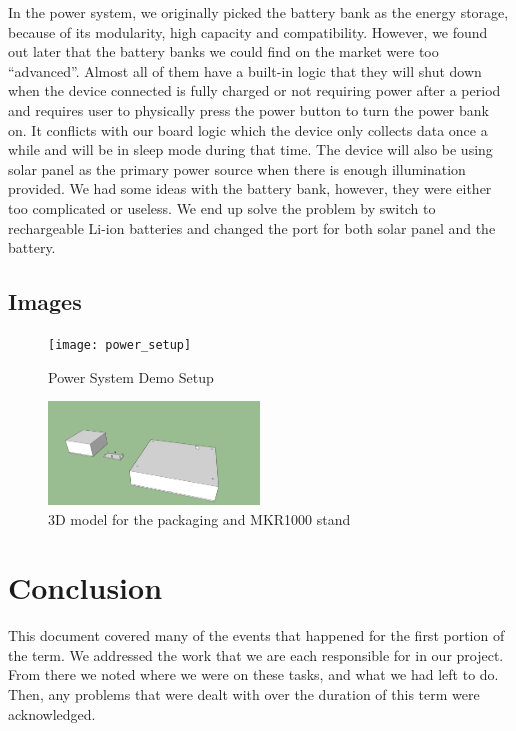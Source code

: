 \documentclass[IEEEtran,letterpaper,10pt,titlepage,fleqn,draftclsnofoot,onecolumn]{article}
\begin{document}
In the power system, we originally picked the battery bank as the energy storage, because of its modularity, high capacity and compatibility. However, we found out later that the battery banks we could find on the market were too “advanced”. Almost all of them have a built-in logic that they will shut down when the device connected is fully charged or not requiring power after a period and requires user to physically press the power button to turn the power bank on. It conflicts with our board logic which the device only collects data once a while and will be in sleep mode during that time. The device will also be using solar panel as the primary power source when there is enough illumination provided. We had some ideas with the battery bank, however, they were either too complicated or useless. We end up solve the problem by switch to rechargeable Li-ion batteries and changed the port for both solar panel and the battery.

\subsection{Images}

\begin{figure}[H]
  \caption{Power System Demo Setup}
  \centering
  \texttt{[image: power\_setup]}
\end{figure}

\begin{figure}[H]
  \caption{3D model for the packaging and MKR1000 stand}
  \centering
  \includegraphics[width=0.5\textwidth]{packaging}
\end{figure}


\section{Conclusion}

This document covered many of the events that happened for the first portion of the term. We addressed the work that we are each responsible for in our project. From there we noted where we were on these tasks, and what we had left to do. Then, any problems that were dealt with over the duration of this term were acknowledged.
\end{document}
